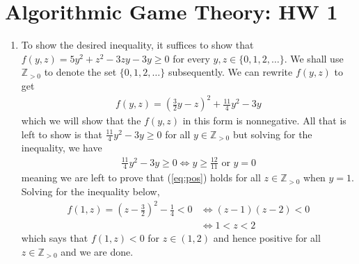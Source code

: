 \documentclass[a4paper,12pt]{article}
\theoremstyle{definition}
\begin{document}
\section*{Algorithmic Game Theory: HW 1}

\begin{enumerate}
\item To show the desired inequality, it suffices to show that $f(y,z) = 5y^2+z^2-3zy-3y \geq 0$ for every $y, z \in \{0,1,2,\ldots\}$. We shall use $\mathbb{Z}_{>0}$ to denote the set $\{0,1,2,\ldots\}$ subsequently. We can rewrite $f(y,z)$ to get
\begin{align}
f(y,z) = \left(\frac{3}{2}y-z\right)^2+\frac{11}{4}y^2-3y \label{eq:pos}
\end{align}
which we will show that the $f(y,z)$ in this form is nonnegative. All that is left to show is that  $\frac{11}{4}y^2-3y \geq 0$ for all $y\in \mathbb{Z}_{>0}$ but solving for the inequality, we have
\begin{align*}
\frac{11}{4}y^2-3y \geq 0 \Leftrightarrow y \geq \frac{12}{11} \text{ or } y=0
\end{align*}
meaning we are left to prove that (\ref{eq:pos}) holds for all $z \in \mathbb{Z}_{>0}$ when $y=1$. Solving for the inequality below, 
\begin{align*}
f(1,z)=\left(z-\frac{3}{2}\right)^2-\frac{1}{4} < 0 &\Leftrightarrow (z-1)(z-2)< 0\\
&\Leftrightarrow 1<z<2
\end{align*} 
which says that $f(1,z)<0$ for $z \in (1,2)$ and hence positive for all $z \in \mathbb{Z}_{>0}$ and we are done.


\end{enumerate}
\end{document}
